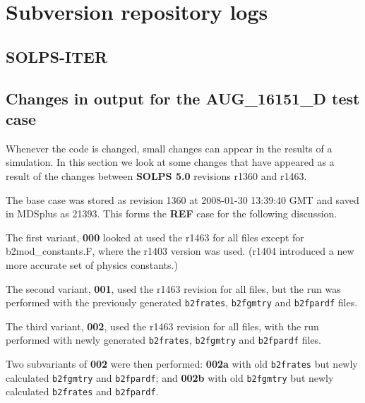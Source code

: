 \documentclass[a4paper,10pt]{report}
\begin{document}
\chapter{Subversion repository logs}

\section{SOLPS-ITER}



\section{Changes in output for the AUG\_16151\_D test case}

Whenever the code is changed, small changes can appear in the results of a simulation.  In this section we look at some changes that have appeared as a result of the changes between {\bf SOLPS 5.0} revisions r1360 and r1463.

The base case was stored as revision 1360 at 2008-01-30 13:39:40 GMT
and saved in MDSplus as 21393.  This forms the {\bf REF} case for the
following discussion.

The first variant, {\bf 000} looked at used the r1463 for all files
except for b2mod\_constants.F, where the r1403 version was used.
(r1404 introduced a new more accurate set of physics constants.)

The second variant, {\bf 001}, used the r1463 revision for all files,
but the run was performed with the previously generated
{\tt b2frates}, {\tt b2fgmtry} and {\tt b2fpardf} files.

The third variant, {\bf 002}, used the r1463 revision for all files,
with the run performed with newly generated {\tt b2frates},
{\tt b2fgmtry} and {\tt b2fpardf} files.

Two subvariants of {\bf 002} were then performed: {\bf 002a} with old
{\tt b2frates} but newly calculated {\tt b2fgmtry} and
{\tt b2fpardf}; and {\bf 002b} with old {\tt b2fgmtry} but newly
calculated {\tt b2frates} and {\tt b2fpardf}.
\end{document}
